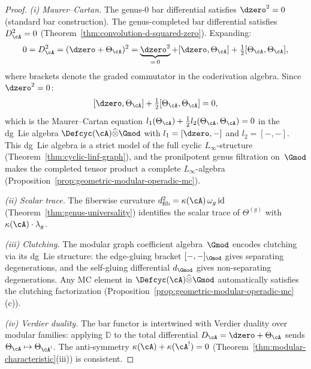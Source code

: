 \begin{proof}
\emph{(i) Maurer--Cartan.}
The genus-$0$ bar differential satisfies $\dzero^2 = 0$
(standard bar construction).  The genus-completed bar
differential satisfies $D_\cA^2 = 0$
(Theorem~\ref{thm:convolution-d-squared-zero}).  Expanding:
\[
0 = D_\cA^2
= (\dzero + \Theta_\cA)^2
= \underbrace{\dzero^2}_{=\,0}
+ [\dzero, \Theta_\cA]
+ \tfrac{1}{2}[\Theta_\cA, \Theta_\cA],
\]
where brackets denote the graded commutator in the coderivation
algebra.  Since $\dzero^2 = 0$:
\[
[\dzero, \Theta_\cA]
+ \tfrac{1}{2}[\Theta_\cA, \Theta_\cA]
= 0,
\]
which is the Maurer--Cartan equation
$l_1(\Theta_\cA) + \tfrac12 l_2(\Theta_\cA, \Theta_\cA) = 0$
in the dg~Lie algebra $\Defcyc(\cA) \widehat{\otimes} \Gmod$
with $l_1 = [\dzero,-]$ and $l_2 = [-,-]$.
This dg~Lie algebra is a strict model of the full cyclic
$L_\infty$-structure
(Theorem~\ref{thm:cyclic-linf-graph}), and the pronilpotent
genus filtration on~$\Gmod$ makes the completed tensor product
a complete $L_\infty$-algebra
(Proposition~\ref{prop:geometric-modular-operadic-mc}).

\emph{(ii) Scalar trace.}
The fiberwise curvature
$d_{\mathrm{fib}}^2 = \kappa(\cA)\,\omega_g\,\mathrm{id}$
(Theorem~\ref{thm:genus-universality}) identifies the scalar
trace of $\Theta^{(g)}$ with $\kappa(\cA) \cdot \lambda_g$.

\emph{(iii) Clutching.}
The modular graph coefficient algebra~$\Gmod$ encodes
clutching via its dg~Lie structure: the edge-gluing bracket
$[-,-]_{\Gmod}$ gives separating degenerations, and the
self-gluing differential $d_{\Gmod}$ gives non-separating
degenerations.  Any MC element in
$\Defcyc(\cA) \widehat{\otimes} \Gmod$ automatically
satisfies the clutching factorization
(Proposition~\ref{prop:geometric-modular-operadic-mc}(c)).

\emph{(iv) Verdier duality.}
The bar functor is intertwined with Verdier duality
over modular families: applying $\mathbb{D}$ to the total
differential $D_\cA = \dzero + \Theta_\cA$ sends
$\Theta_\cA \mapsto \Theta_{\cA^!}$.  The anti-symmetry
$\kappa(\cA) + \kappa(\cA^!) = 0$
(Theorem~\ref{thm:modular-characteristic}(iii))
is consistent.
\end{proof}

